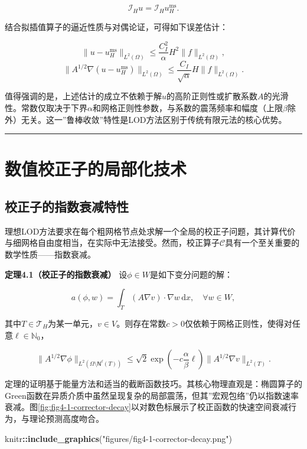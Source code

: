 \documentclass[
]{article}
\newenvironment{Shaded}{\begin{snugshade}}{\end{snugshade}}
\newcommand{\FunctionTok}[1]{\textcolor[rgb]{0.13,0.29,0.53}{\textbf{#1}}}
\newcommand{\NormalTok}[1]{#1}
\newcommand{\SpecialCharTok}[1]{\textcolor[rgb]{0.81,0.36,0.00}{\textbf{#1}}}
\newcommand{\StringTok}[1]{\textcolor[rgb]{0.31,0.60,0.02}{#1}}
\begin{document}
\[
\mathcal{I}_H u = \mathcal{I}_H u_H^{\mathrm{ms}}.
\]

结合拟插值算子的逼近性质与对偶论证，可得如下误差估计：

\[
\|u - u_H^{\mathrm{ms}}\|_{L^2(\Omega)} \leq \frac{C_I^2}{\alpha} H^2 \|f\|_{L^2(\Omega)},
\]
\[
\|A^{1/2}\nabla(u - u_H^{\mathrm{ms}})\|_{L^2(\Omega)} \leq \frac{C_I}{\sqrt{\alpha}} H \|f\|_{L^2(\Omega)}.
\]

值得强调的是，上述估计的成立不依赖于解\(u\)的高阶正则性或扩散系数\(A\)的光滑性。常数仅取决于下界\(\alpha\)和网格正则性参数，与系数的震荡频率和幅度（上限\(\beta\)除外）无关。这一''鲁棒收敛''特性是LOD方法区别于传统有限元法的核心优势。

\begin{center}\rule{0.5\linewidth}{0.5pt}\end{center}

\section{数值校正子的局部化技术}\label{chap-4}

\subsection{校正子的指数衰减特性}\label{chap-4-1}

理想LOD方法要求在每个粗网格节点处求解一个全局的校正子问题，其计算代价与细网格自由度相当，在实际中无法接受。然而，校正算子\(\mathcal{C}\)具有一个至关重要的数学性质------指数衰减。

\textbf{定理4.1（校正子的指数衰减）} 设\(\phi \in W\)是如下变分问题的解：

\[
a(\phi, w) = \int_T (A\nabla v) \cdot \nabla w \, \mathrm{d}x, \quad \forall w \in W,
\]

其中\(T \in \mathcal{T}_H\)为某一单元，\(v \in V\)。则存在常数\(c > 0\)仅依赖于网格正则性，使得对任意\(\ell \in \mathbb{N}_0\)，

\[
\|A^{1/2}\nabla \phi\|_{L^2(\Omega \setminus \mathsf{N}^\ell(T))} \leq \sqrt{2} \exp\left(-c\frac{\alpha}{\beta}\ell\right) \|A^{1/2}\nabla v\|_{L^2(T)}.
\]

定理的证明基于能量方法和适当的截断函数技巧。其核心物理直观是：椭圆算子的Green函数在异质介质中虽然呈现复杂的局部震荡，但其''宏观包络''仍以指数速率衰减。图\ref{fig:fig4-1-corrector-decay}以对数色标展示了校正函数的快速空间衰减行为，与理论预测高度吻合。

\begin{Shaded}
\begin{Highlighting}[]
\NormalTok{knitr}\SpecialCharTok{::}\FunctionTok{include\_graphics}\NormalTok{(}\StringTok{"figures/fig4{-}1{-}corrector{-}decay.png"}\NormalTok{)}
\end{Highlighting}
\end{Shaded}
\end{document}

